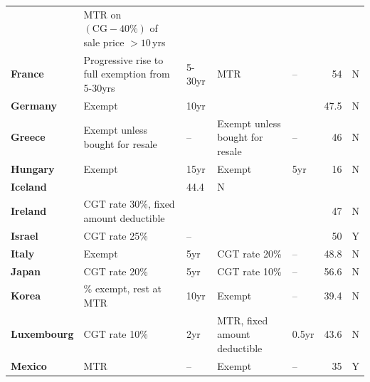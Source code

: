\documentclass{grattanAlpha}\usepackage[]{graphicx}\usepackage[]{color}
\begin{document}
\begin{longtable}{l>{\raggedleft}p{8.05cm}>{\raggedleft}p{1.45cm}>{\raggedleft}p{6.75cm}>{\raggedleft}p{1.45cm}r>{\raggedleft\arraybackslash}p{1.55cm}}
          & \cellcolor{Color3}MTR on $(\text{CG}-40\%)$ of sale price $>10$\,yrs  &   \cellcolor{Color3}     &  \cellcolor{Color3}      &  \cellcolor{Color3}      &   \cellcolor{Color3}     &  \cellcolor{Color3}  \\[4pt]
    \textbf{France} &  \cellcolor{Color3} Progressive rise to full exemption from 5-30yrs &  \cellcolor{Color3} 5-30yr & \cellcolor{Color6} MTR   &  \cellcolor{Color6}--     &  \cellcolor{Color6}54    & \cellcolor{Color3} N \\
    \textbf{Germany} &  \cellcolor{Color3}Exempt &  \cellcolor{Color3}10yr  &  \cellcolor{Color4}{26\% exempt, rest at MTR} &  \cellcolor{Color4}{--}     &  \cellcolor{Color3}47.5  & \cellcolor{Color3} N \\
    \textbf{Greece} &  \cellcolor{Color2}Exempt unless bought for resale &  \cellcolor{Color2}--     &  \cellcolor{Color2}Exempt unless bought for resale & \cellcolor{Color2} --     &  \cellcolor{Color3}46    & \cellcolor{Color3} N \\
    \textbf{Hungary} &  \cellcolor{Color3}Exempt &  \cellcolor{Color3}15yr  &  \cellcolor{Color3}Exempt &  \cellcolor{Color3}5yr   &  \cellcolor{Color1}16    &  \cellcolor{Color3}N \\
    \textbf{Iceland} & \multicolumn{4}{c}{\cellcolor{Color6}{\textcolor{white}{MTR}}} &  \cellcolor{Color2}44.4  &  \cellcolor{Color3}N \\
    \textbf{Ireland} & \cellcolor{Color3}CGT rate 30\%, fixed amount deductible & \cellcolor{Color3}{--}     & \cellcolor{Color6}{\textcolor{white}{MTR}}   & \cellcolor{Color6}{\textcolor{white}{--}}     & \cellcolor{Color3}47    & \cellcolor{Color3}N \\
    \textbf{Israel} &\cellcolor{Color3} CGT rate 25\% & \cellcolor{Color3} --     & \cellcolor{Color6}{\textcolor{white}{MTR}}   & \cellcolor{Color6}{\textcolor{white}{--}}   & \cellcolor{Color3}50    & \cellcolor{Color3}Y \\
    \textbf{Italy} & Exempt & 5yr   & CGT rate 20\% & --     & 48.8  & N \\
    \textbf{Japan} & CGT rate 20\% & 5yr   & CGT rate 10\% & --     & 56.6  & N \\
    \textbf{Korea} & 30\% exempt, rest at MTR & 10yr  & Exempt & --     & 39.4  & N \\
    \textbf{Luxembourg} & CGT rate 10\% & 2yr   & MTR, fixed amount deductible & 0.5yr & 43.6  & N \\
    \textbf{Mexico} & MTR   & --     & Exempt & --     & 35    & Y \\

\end{longtable}
\end{document}

